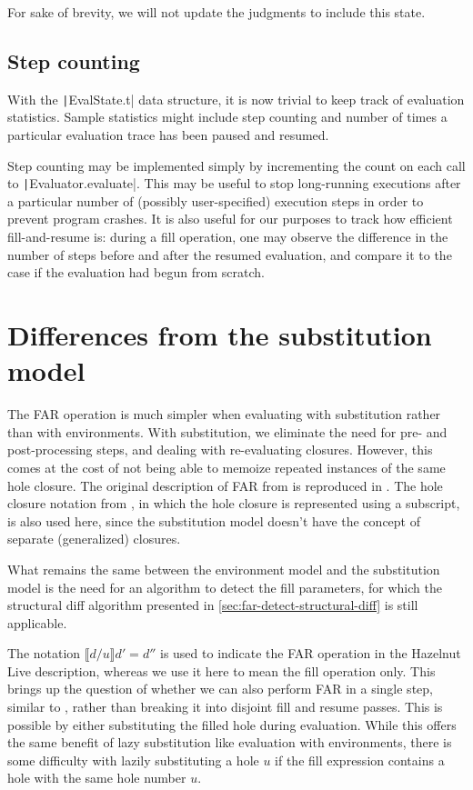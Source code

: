 For sake of brevity, we will not update the judgments to include this state.

\subsection{Step counting}
\label{sec:step-counting}

With the \texttt|EvalState.t| data structure, it is now trivial to keep track of evaluation statistics. Sample statistics might include step counting and number of times a particular evaluation trace has been paused and resumed.

Step counting may be implemented simply by incrementing the count on each call to \texttt|Evaluator.evaluate|. This may be useful to stop long-running executions after a particular number of (possibly user-specified) execution steps in order to prevent program crashes. It is also useful for our purposes to track how efficient fill-and-resume is: during a fill operation, one may observe the difference in the number of steps before and after the resumed evaluation, and compare it to the case if the evaluation had begun from scratch.

\section{Differences from the substitution model}
\label{sec:far-sub}

The FAR operation is much simpler when evaluating with substitution rather than with environments. With substitution, we eliminate the need for pre- and post-processing steps, and dealing with re-evaluating closures. However, this comes at the cost of not being able to memoize repeated instances of the same hole closure. The original description of FAR from \cite{conf/popl/HazelnutLive19} is reproduced in . The hole closure notation from \cite{conf/popl/HazelnutLive19}, in which the hole closure is represented using a subscript, is also used here, since the substitution model doesn't have the concept of separate (generalized) closures.

What remains the same between the environment model and the substitution model is the need for an algorithm to detect the fill parameters, for which the structural diff algorithm presented in \cref{sec:far-detect-structural-diff} is still applicable.

The notation $\llbracket d/u\rrbracket d'=d''$ is used to indicate the FAR operation in the Hazelnut Live description, whereas we use it here to mean the fill operation only. This brings up the question of whether we can also perform FAR in a single step, similar to , rather than breaking it into disjoint fill and resume passes. This is possible by either substituting the filled hole during evaluation. While this offers the same benefit of lazy substitution like evaluation with environments, there is some difficulty with lazily substituting a hole $u$ if the fill expression contains a hole with the same hole number $u$.

